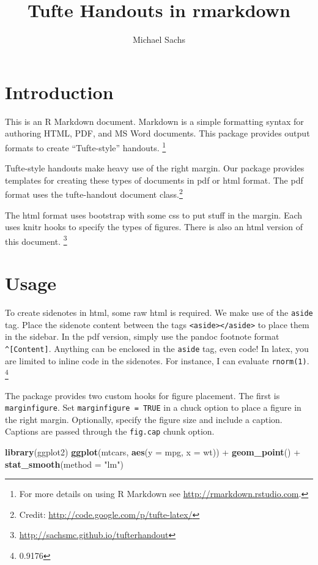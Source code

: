 \documentclass{tufte-handout}
\title{Tufte Handouts in rmarkdown}
\author{Michael Sachs}
\newenvironment{Shaded}{}{}
\newcommand{\KeywordTok}[1]{\textcolor[rgb]{0.00,0.44,0.13}{\textbf{{#1}}}}
\newcommand{\DataTypeTok}[1]{\textcolor[rgb]{0.56,0.13,0.00}{{#1}}}
\newcommand{\StringTok}[1]{\textcolor[rgb]{0.25,0.44,0.63}{{#1}}}
\newcommand{\NormalTok}[1]{{#1}}
\begin{document}
\maketitle

\section{Introduction}\label{introduction}

This is an R Markdown document. Markdown is a simple formatting syntax
for authoring HTML, PDF, and MS Word documents. This package provides
output formats to create ``Tufte-style'' handouts. \footnote{For more
  details on using R Markdown see \url{http://rmarkdown.rstudio.com}.}

Tufte-style handouts make heavy use of the right margin. Our package
provides templates for creating these types of documents in pdf or html
format. The pdf format uses the tufte-handout document class.\footnote{Credit:
  \url{http://code.google.com/p/tufte-latex/}}

The html format uses bootstrap with some css to put stuff in the margin.
Each uses knitr hooks to specify the types of figures. There is also an
html version of this document. \footnote{\url{http://sachsmc.github.io/tufterhandout}}

\section{Usage}\label{usage}

To create sidenotes in html, some raw html is required. We make use of
the \texttt{aside} tag. Place the sidenote content between the tags
\texttt{\textless{}aside\textgreater{}\textless{}/aside\textgreater{}}
to place them in the sidebar. In the pdf version, simply use the pandoc
footnote format \texttt{\^{}{[}Content{]}}. Anything can be enclosed in
the \texttt{aside} tag, even code! In latex, you are limited to inline
code in the sidenotes. For instance, I can evaluate \texttt{rnorm(1)}.
\footnote{0.9176}

The package provides two custom hooks for figure placement. The first is
\texttt{marginfigure}. Set \texttt{marginfigure = TRUE} in a chuck
option to place a figure in the right margin. Optionally, specify the
figure size and include a caption. Captions are passed through the
\texttt{fig.cap} chunk option.

\begin{Shaded}
\begin{Highlighting}[]
\KeywordTok{library}\NormalTok{(ggplot2)}
\KeywordTok{ggplot}\NormalTok{(mtcars, }\KeywordTok{aes}\NormalTok{(}\DataTypeTok{y =} \NormalTok{mpg, }\DataTypeTok{x =} \NormalTok{wt)) +}\StringTok{ }\KeywordTok{geom_point}\NormalTok{() +}\StringTok{ }
\StringTok{    }\KeywordTok{stat_smooth}\NormalTok{(}\DataTypeTok{method =} \StringTok{"lm"}\NormalTok{)}
\end{Highlighting}
\end{Shaded}
\end{document}
